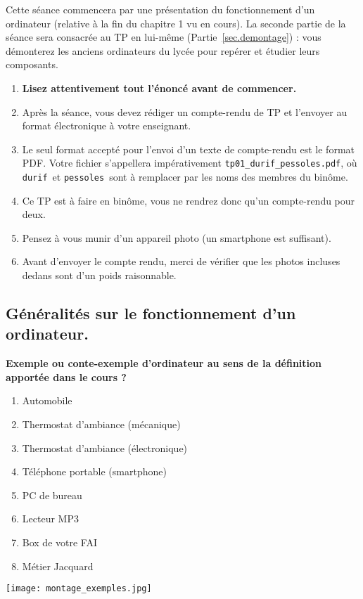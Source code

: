 Cette séance commencera par une présentation du fonctionnement d'un ordinateur (relative à la fin du chapitre 1 vu en cours). 
La seconde partie de la séance sera consacrée au TP en lui-même (Partie~\ref{sec.demontage}) : vous 
démonterez les anciens ordinateurs du lycée pour repérer et étudier leurs composants. 

\begin{enumerate}
\item  \textbf{Lisez attentivement  tout l'énoncé
    avant de commencer.}
\item Après la séance, vous devez rédiger un compte-rendu de TP et
l'envoyer au format électronique à votre enseignant.
\item Le seul format accepté pour l'envoi d'un texte de compte-rendu est le
format PDF. Votre fichier s'appellera impérativement \texttt{tp01\_durif\_pessoles.pdf}, où \og \texttt{durif}\fg\ et \og \texttt{pessoles}\fg\ sont à remplacer par les noms des membres du binôme. 
\item Ce TP est à faire en binôme, vous ne rendrez donc qu'un
  compte-rendu pour deux.
\item Pensez à vous munir d'un appareil photo (un smartphone est suffisant).
\item Avant d'envoyer le compte rendu, merci de vérifier que les photos incluses dedans sont d'un poids raisonnable.
\end{enumerate}

\subsection{Généralités sur le fonctionnement d'un ordinateur.}\label{sec.ordi}



\begin{exemple}
\textbf{Exemple ou conte-exemple d'ordinateur au sens de la définition apportée dans le cours ?}

\begin{minipage}{0.4\textwidth}
\begin{enumerate}
\item Automobile
\item Thermostat d'ambiance (mécanique)
\item Thermostat d'ambiance (électronique)
\item Téléphone portable (smartphone)
\item PC de bureau
\item Lecteur MP3
\item Box de votre FAI
\item Métier Jacquard
\end{enumerate}

\end{minipage}
\begin{minipage}{0.5\textwidth}
\begin{center}
\texttt{[image: montage\_exemples.jpg]}
\end{center}
\end{minipage}
\end{exemple}


